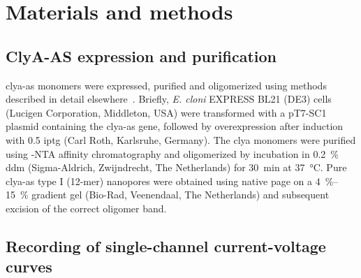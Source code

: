 \section{Materials and methods}
%
\label{sec:transport:methods}
%
%

\subsection{{ClyA-AS} expression and purification}
%

\Gls{clya-as} monomers were expressed, purified and oligomerized using methods described in detail
elsewhere~\cite{Soskine-2012,Soskine-2013}. Briefly, \textit{E. cloni} {EXPRESS BL21} (DE3) cells (Lucigen
Corporation, Middleton, USA) were transformed with a {pT7-SC1} plasmid containing the \gls{clya-as} gene,
followed by overexpression after induction with \SI{0.5}{\mM} \gls{iptg} (Carl Roth, Karlsruhe, Germany). The
\gls{clya} monomers were purified using -NTA affinity chromatography and oligomerized by incubation in
\SI{0.2}{\percent} \gls{ddm} (Sigma-Aldrich, Zwijndrecht, The Netherlands) for \SI{30}{\minute} at
\SI{37}{\celsius}. Pure \gls{clya-as} {type I} (12-mer) nanopores were obtained using native \gls{page} on a
\SIrange[range-phrase = --]{4}{15}{\percent} gradient gel (Bio-Rad, Veenendaal, The Netherlands) and
subsequent excision of the correct oligomer band.

\subsection{Recording of single-channel current-voltage curves}
%

